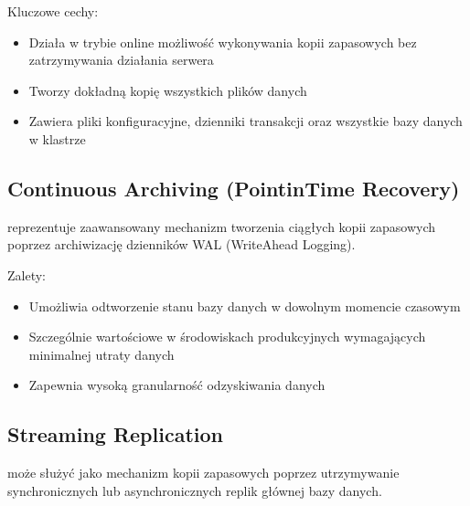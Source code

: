 \documentclass[a4paper,11pt,polish]{sphinxmanual}
\begin{document}
\sphinxAtStartPar
Kluczowe cechy:
\begin{itemize}
\item {} 
\sphinxAtStartPar
Działa w trybie online \sphinxhyphen{} możliwość wykonywania kopii zapasowych bez zatrzymywania działania serwera

\item {} 
\sphinxAtStartPar
Tworzy dokładną kopię wszystkich plików danych

\item {} 
\sphinxAtStartPar
Zawiera pliki konfiguracyjne, dzienniki transakcji oraz wszystkie bazy danych w klastrze

\end{itemize}


\subsection{Continuous Archiving (Point\sphinxhyphen{}in\sphinxhyphen{}Time Recovery)}
\label{\detokenize{Kopie_zapasowe_i_odzyskiwanie_danych/kopie_zapasowe_i_odzyskiwanie_danych:continuous-archiving-point-in-time-recovery}}
\sphinxAtStartPar
{} reprezentuje zaawansowany mechanizm tworzenia ciągłych kopii zapasowych poprzez archiwizację dzienników WAL (Write\sphinxhyphen{}Ahead Logging).

\sphinxAtStartPar
Zalety:
\begin{itemize}
\item {} 
\sphinxAtStartPar
Umożliwia odtworzenie stanu bazy danych w dowolnym momencie czasowym

\item {} 
\sphinxAtStartPar
Szczególnie wartościowe w środowiskach produkcyjnych wymagających minimalnej utraty danych

\item {} 
\sphinxAtStartPar
Zapewnia wysoką granularność odzyskiwania danych

\end{itemize}


\subsection{Streaming Replication}
\label{\detokenize{Kopie_zapasowe_i_odzyskiwanie_danych/kopie_zapasowe_i_odzyskiwanie_danych:streaming-replication}}
\sphinxAtStartPar
{} może służyć jako mechanizm kopii zapasowych poprzez utrzymywanie synchronicznych lub asynchronicznych replik głównej bazy danych.
\end{document}
